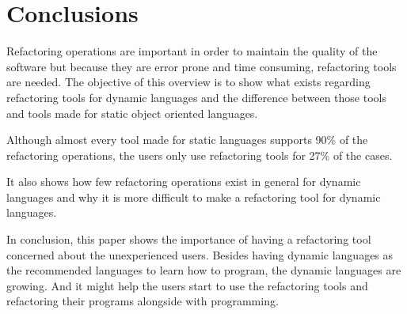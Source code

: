 
% 
% 

\section{Conclusions}



Refactoring operations are important in order to maintain the quality of the software but because they are error prone and time consuming, refactoring tools are needed.
The objective of this overview is to show what exists regarding refactoring tools for dynamic languages and the difference between those tools and tools made for static object oriented languages.


Although almost every tool made for static languages supports 90\% of the refactoring operations, the users only use refactoring tools for 27\% of the cases. %

It also shows how few refactoring operations exist in general for dynamic languages and why it is more difficult to make a refactoring tool for dynamic languages.

In conclusion, this paper shows the importance of having a refactoring tool concerned about the unexperienced users. Besides having dynamic languages as the recommended languages to learn how to program, the dynamic languages are growing. And it might help the users start to use the refactoring tools and refactoring their programs alongside with programming.

